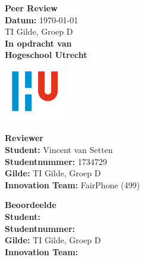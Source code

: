 \documentclass[a4paper]{report}
\begin{document}
\begin{titlepage}
  \begin{center}
      \vspace*{.9cm}
      \Huge
      \textbf{ Peer Review }\\
      \vspace{0.2cm}
      \small \textbf{Datum:} \today \\
      \small TI Gilde, Groep D \\

      \vspace{2cm}
      \normalsize
      \vspace{1cm}
      \Large
      \textbf{In opdracht van}\\
      \large
      \textbf{Hogeschool Utrecht} \\
      \includegraphics[width=0.2\textwidth]{Images/logouni.png}
      \vfill

      \begin{minipage}{0.45\textwidth}
        \textbf{Reviewer}\\
        \textbf{Student:} Vincent van Setten \\
        \textbf{Studentnummer:} 1734729 \\
        \textbf{Gilde:} TI Gilde, Groep D\\
        \textbf{Innovation Team:} FairPhone (499) \\
        \vspace{2cm}
      \end{minipage}
      \hfill
      \begin{minipage}{0.45\textwidth}
        \textbf{Beoordeelde}\\
        \textbf{Student:}  \\
        \textbf{Studentnummer:} \\
        \textbf{Gilde:} TI Gilde, Groep D\\
        \textbf{Innovation Team:}  \\
        \vspace{2cm}
      \end{minipage}
    \end{center}
\end{titlepage}
\end{document}
